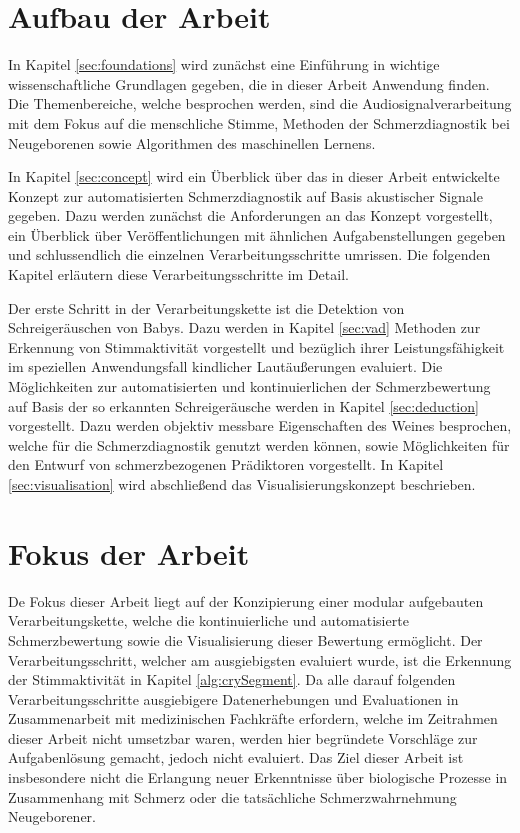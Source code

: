 \section{Aufbau der Arbeit}

In Kapitel \ref{sec:foundations} wird zunächst eine Einführung in wichtige wissenschaftliche Grundlagen gegeben, die in dieser Arbeit Anwendung finden. Die Themenbereiche, welche besprochen werden, sind die Audiosignalverarbeitung mit dem Fokus auf die menschliche Stimme, Methoden der Schmerzdiagnostik bei Neugeborenen sowie Algorithmen des maschinellen Lernens. 

In Kapitel \ref{sec:concept} wird ein Überblick über das in dieser Arbeit entwickelte Konzept zur automatisierten Schmerzdiagnostik auf Basis akustischer Signale gegeben. Dazu werden zunächst die Anforderungen an das Konzept vorgestellt, ein Überblick über Veröffentlichungen mit ähnlichen Aufgabenstellungen gegeben und schlussendlich die einzelnen Verarbeitungsschritte umrissen. Die folgenden Kapitel erläutern diese Verarbeitungsschritte im Detail. 

Der erste Schritt in der Verarbeitungskette ist die Detektion von Schreigeräuschen von Babys. Dazu werden in Kapitel \ref{sec:vad} Methoden zur Erkennung von Stimmaktivität vorgestellt und bezüglich ihrer Leistungsfähigkeit im speziellen Anwendungsfall kindlicher Lautäußerungen evaluiert. Die Möglichkeiten zur automatisierten und kontinuierlichen der Schmerzbewertung auf Basis der so erkannten Schreigeräusche werden in Kapitel \ref{sec:deduction} vorgestellt. Dazu  werden objektiv messbare Eigenschaften des Weines besprochen, welche für die Schmerzdiagnostik genutzt werden können, sowie Möglichkeiten für den Entwurf von schmerzbezogenen Prädiktoren vorgestellt. In Kapitel \ref{sec:visualisation} wird abschließend das Visualisierungskonzept beschrieben.

\section{Fokus der Arbeit}

De Fokus dieser Arbeit liegt auf der Konzipierung einer modular aufgebauten Verarbeitungskette, welche die kontinuierliche und automatisierte Schmerzbewertung sowie die Visualisierung dieser Bewertung ermöglicht. Der Verarbeitungsschritt, welcher am ausgiebigsten evaluiert wurde, ist die Erkennung der Stimmaktivität in Kapitel \ref{alg:crySegment}. Da alle darauf folgenden Verarbeitungsschritte ausgiebigere Datenerhebungen und Evaluationen in Zusammenarbeit mit medizinischen Fachkräfte erfordern, welche im Zeitrahmen dieser Arbeit nicht umsetzbar waren, werden hier begründete Vorschläge zur Aufgabenlösung gemacht, jedoch nicht evaluiert. Das Ziel dieser Arbeit ist insbesondere nicht die Erlangung neuer Erkenntnisse über biologische Prozesse in Zusammenhang mit Schmerz oder die tatsächliche Schmerzwahrnehmung Neugeborener.